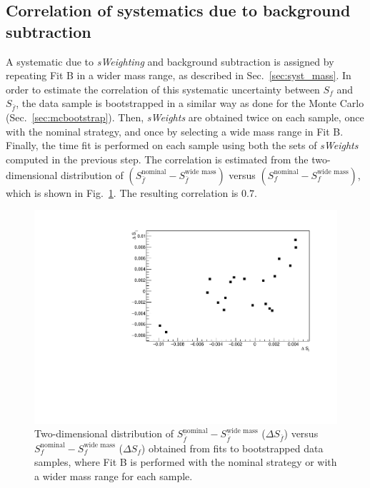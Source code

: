 \subsection{Correlation of systematics due to background subtraction}
A systematic due to \emph{sWeighting} and background subtraction is assigned by repeating Fit B in a wider mass range, as described in Sec.~\ref{sec:syst_mass}. In order to estimate the correlation of this systematic uncertainty between $S_f$ and $S_{\bar f}$, the data sample is bootstrapped in a similar way as done for the Monte Carlo (Sec.~\ref{sec:mcbootstrap}). Then, \emph{sWeights} are obtained twice on each sample, once with the nominal strategy, and once by selecting a wide mass range in Fit B. Finally, the time fit is performed on each sample using both the sets of \emph{sWeights} computed in the previous step. The correlation is estimated from the two-dimensional distribution of $(S_{\bar f}^{\textrm{nominal}} - S_{\bar f}^{\textrm{wide~mass}})$ versus $(S_f^{\textrm{nominal}} - S_f^{\textrm{wide~mass}})$, which is shown in Fig.~\ref{fig:bkgsub_corr}. The resulting correlation is $0.7$.
\begin{figure}[t]
        \begin{center}
          \includegraphics[width=0.7\linewidth]{AA-Appdx-corrSyst/figs/bkgsub_corr.pdf}
        \end{center}
        \vspace{-2mm}
        \caption{Two-dimensional distribution of $S_{\bar f}^{\textrm{nominal}} - S_{\bar f}^{\textrm{wide~mass}}$ ($\Delta S_{\bar f}$) versus $S_f^{\textrm{nominal}} - S_f^{\textrm{wide~mass}}$ ($\Delta S_f$) obtained from fits to bootstrapped data samples, where Fit B is performed with the nominal strategy or with a wider mass range for each sample.}
        \label{fig:bkgsub_corr}
\end{figure}
